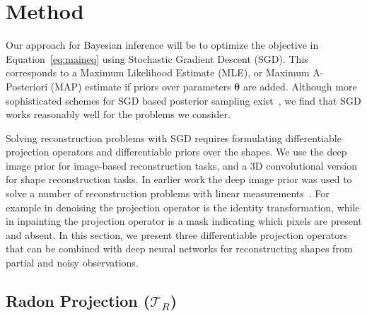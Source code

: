 \section{Method}
\label{sec:method}
Our approach for Bayesian inference will be to optimize the objective in Equation~\ref{eq:maineq} using Stochastic Gradient Descent (SGD). 
This corresponds to a Maximum Likelihood Estimate (MLE), or Maximum A-Posteriori (MAP) estimate if priors over parameters $\bm{\theta}$ are added.
Although more sophisticated schemes for SGD based posterior sampling exist~\cite{sgld, bayesiandip}, we find that SGD works reasonably well for the problems we consider.


Solving reconstruction problems with SGD requires formulating differentiable projection operators and differentiable priors over the shapes.
We use the deep image prior for image-based reconstruction tasks, and a 3D convolutional version for shape reconstruction tasks.
In earlier work the deep image prior was used to solve a number of reconstruction problems with linear measurements~\cite{ulyanov17deep}. 
For example in denoising the projection operator is the identity transformation, while in inpainting the projection operator is a mask indicating which pixels are present and absent. 
In this section, we present three differentiable projection operators that can be combined with deep neural networks for reconstructing shapes from partial and noisy observations.


\subsection{Radon Projection ($\mathcal{T}_R$)}

